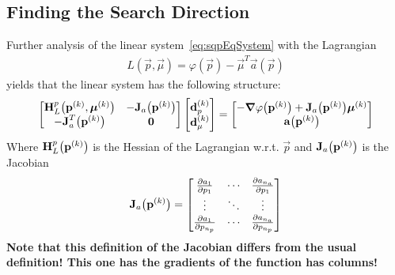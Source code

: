 		\subsection{Finding the Search Direction}
			Further analysis of the linear system~\eqref{eq:sqpEqSystem} with the Lagrangian
			\begin{align*}
				L(\vec{p}, \vec{\mu}) = \varphi(\vec{p}) - \vec{\mu}^T \vec{a}(\vec{p})
			\end{align*}
			yields that the linear system has the following structure:
			\begin{align*}
				\begin{bmatrix}
					\boldsymbol{\mathrm{H}}_L^p\big(\boldsymbol{\mathrm{p}}^{(k)}, \boldsymbol{\mathrm{\mu}}^{(k)}\big) & -\boldsymbol{\mathrm{J}}_a\big(\boldsymbol{\mathrm{p}}^{(k)}\big) \\
					-\boldsymbol{\mathrm{J}}_a^T\big(\boldsymbol{\mathrm{p}}^{(k)}\big) & \boldsymbol{\mathrm{0}}
				\end{bmatrix}
				\begin{bmatrix}
					\boldsymbol{\mathrm{d}}_p^{(k)} \\
					\boldsymbol{\mathrm{d}}_\mu^{(k)}
				\end{bmatrix}
				=
				\begin{bmatrix}
					-\grad{\varphi}\big(\boldsymbol{\mathrm{p}}^{(k)}\big) + \boldsymbol{\mathrm{J}}_a\big(\boldsymbol{\mathrm{p}}^{(k)}\big) \boldsymbol{\mathrm{\mu}}^{(k)} \\
					\boldsymbol{\mathrm{a}}\big(\boldsymbol{\mathrm{p}}^{(k)}\big)
				\end{bmatrix}
			\end{align*}
			Where \( \boldsymbol{\mathrm{H}}_L^p\big(\boldsymbol{\mathrm{p}}^{(k)}\big) \) is the Hessian of the Lagrangian w.r.t. \(\vec{p}\) and \( \boldsymbol{\mathrm{J}}_a\big(\boldsymbol{\mathrm{p}}^{(k)}\big) \) is the Jacobian
			\begin{align*}
				\boldsymbol{\mathrm{J}}_a\big(\boldsymbol{\mathrm{p}}^{(k)}\big) =
					\begin{bmatrix}
						\pdv{a_1}{p_1}     & \cdots & \pdv{a_{n_a}}{p_1}     \\
						\vdots             & \ddots & \vdots                 \\
						\pdv{a_1}{p_{n_p}} & \cdots & \pdv{a_{n_a}}{p_{n_p}}
					\end{bmatrix}
			\end{align*}
			\textbf{Note that this definition of the Jacobian differs from the usual definition! This one has the gradients of the function has columns!}
			
